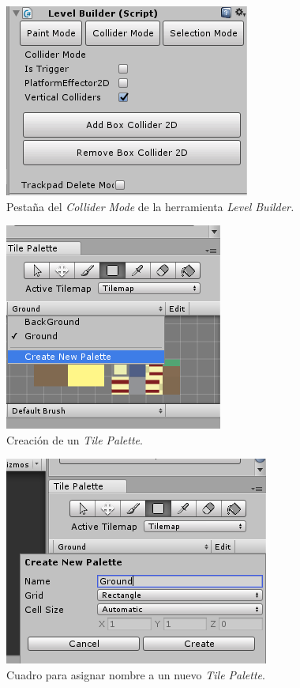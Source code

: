 \begin{figure}[h]
		\centering
		\includegraphics[height=0.2 \textheight]{03TrabajoRealizado/imagenes/levelBuilder03.png}
		\caption{Pestaña del \textit{Collider Mode} de la herramienta 
		\textit{Level 
		Builder.}}
		\label{fig:LevelBuilder02}
\end{figure}

\begin{figure}[h]
		\centering
		\includegraphics[height=0.2 \textheight]{03TrabajoRealizado/imagenes/createTilemap05.png}
		\caption{Creación de un \textit{Tile Palette}.}
		\label{fig:TileMaps01}
\end{figure}

\begin{figure}[h]
		\centering
		\includegraphics[height=0.2 \textheight]{03TrabajoRealizado/imagenes/createTilemap06.png}
		\caption{Cuadro para asignar nombre a un nuevo \textit{Tile Palette}.}
		\label{fig:TileMaps02}
\end{figure}

